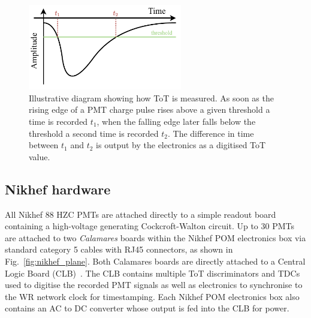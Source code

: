 \begin{figure} %
    \includegraphics[width=0.6\textwidth]{diagrams/5-daq/tot.pdf}
    \caption[Illustrative diagram showing how Time over Threshold is measured.]
    {Illustrative diagram showing how ToT is measured. As soon as the rising edge of a PMT charge
        pulse rises above a given threshold a time is recorded $t_{1}$, when the falling edge
        later falls below the threshold a second time is recorded $t_{2}$. The difference in time
        between $t_{1}$ and $t_{2}$ is output by the electronics as a digitised ToT value.}
    \label{fig:tot}
\end{figure}

\subsection{Nikhef hardware} %
\label{sec:daq_hard_Nikhed} %

All Nikhef \unit{88}{} HZC PMTs are attached directly to a simple readout board
containing a high-voltage generating Cockcroft-Walton circuit. Up to 30 PMTs are attached to two
\emph{Calamares} boards within the Nikhef POM electronics box via standard category 5 cables with
RJ45 connectors, as shown in Fig.~\ref{fig:nikhef_plane}. Both Calamares boards are directly
attached to a Central Logic Board (CLB)~\cite{biagi2015, eijk2015}. The CLB contains multiple ToT
discriminators and TDCs used to digitise the recorded PMT signals as well as electronics to
synchronise to the WR network clock for timestamping. Each Nikhef POM electronics box also
contains an AC to DC converter whose output is fed into the CLB for power.

